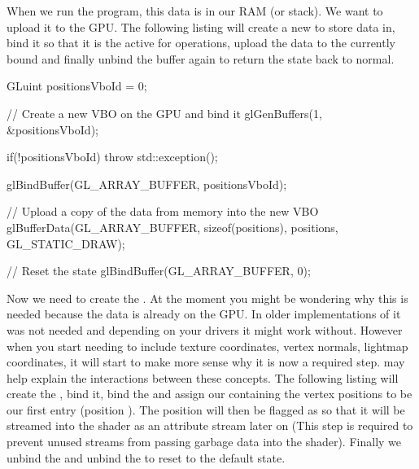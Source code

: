 \documentclass[10pt]{article}
\begin{document}
When we run the program, this data is in our RAM (or stack). We
want to upload it to the GPU. The following listing will create a new
 to store data in, bind it so that it is the
active  for operations, upload the data to the currently bound
 and finally unbind the buffer again to return the state back
to normal.

\begin{Code}
  GLuint positionsVboId = 0;

  // Create a new VBO on the GPU and bind it
  glGenBuffers(1, &positionsVboId);

  if(!positionsVboId)
  {
    throw std::exception();
  }

  glBindBuffer(GL_ARRAY_BUFFER, positionsVboId);

  // Upload a copy of the data from memory into the new VBO
  glBufferData(GL_ARRAY_BUFFER, sizeof(positions), positions, GL_STATIC_DRAW);

  // Reset the state
  glBindBuffer(GL_ARRAY_BUFFER, 0);
\end{Code}


Now we need to create the . At the
moment you might be wondering why this is needed because the data is
already on the GPU.  In older implementations of  it was
not needed and depending on your drivers it might work without. However
when you start needing to include texture coordinates, vertex normals,
lightmap coordinates, it will start to make more sense why it is now
a required step.  may help explain the interactions between
these concepts. The following listing will create the , bind
it, bind the  and assign our  containing the vertex
positions to be our first entry (position ). The position
 will then be flagged as  so that it will be
streamed into the shader as an attribute stream later on (This step
is required to prevent unused streams from passing garbage data into
the shader).  Finally we unbind the  and unbind the 
to reset to the default state.
\end{document}
